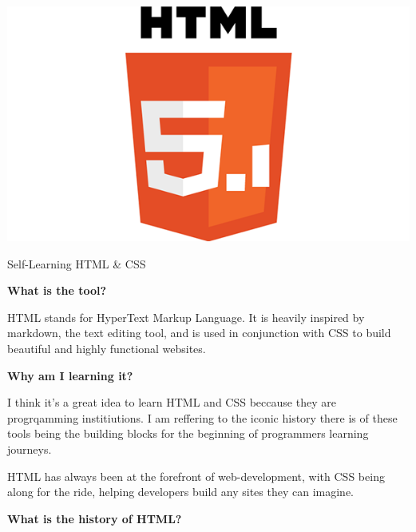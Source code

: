 \documentclass{article}
\begin{document}
\begin{center}
\includegraphics[scale=0.4]{html}

\hfill

\hfill

{\huge Self-Learning HTML \& CSS}

\end{center}

\hfill

\begin{flushleft}
\textbf{\large What is the tool?}
\end{flushleft}

HTML stands for HyperText Markup Language.  It is heavily inspired by markdown, the text editing tool, and is used in conjunction with CSS to build beautiful and highly functional websites.

\hfill

\begin{flushleft}
\textbf{\large Why am I learning it?}
\end{flushleft}

I think it's a great idea to learn HTML and CSS beccause they are progrqamming institiutions.  I am reffering to the iconic history there is of these tools being the building blocks for the beginning of programmers learning journeys.

\hfill

HTML has always been at the forefront of web-development, with CSS being along for the ride,  helping developers build any sites they can imagine.

\hfill

\begin{flushleft}
\textbf{\large What is the history of HTML?}
\end{flushleft}
\end{document}
